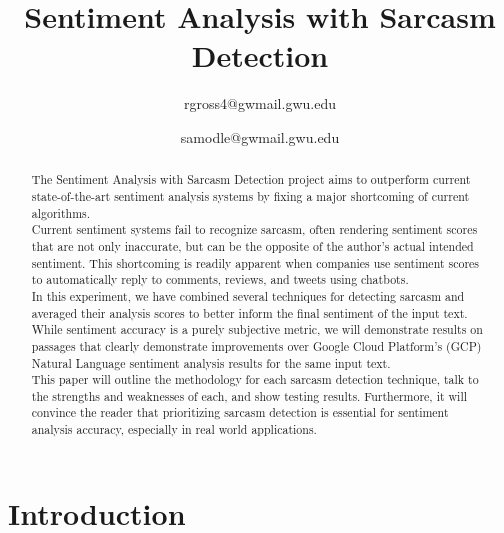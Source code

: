 \documentclass[conference]{IEEEtran}
\begin{document}
\title{Sentiment Analysis with Sarcasm Detection\\
}

\author{
rgross4@gwmail.gwu.edu
\and
{}
samodle@gwmail.gwu.edu
}

\maketitle

\begin{abstract}
The Sentiment Analysis with Sarcasm Detection project aims to outperform current state-of-the-art sentiment analysis systems by fixing a major shortcoming of current algorithms. \\
Current sentiment systems fail to recognize sarcasm, often rendering sentiment scores that are not only inaccurate, but can be the opposite of the author’s actual intended sentiment. This shortcoming is readily apparent when companies use sentiment scores to automatically reply to comments, reviews, and tweets using chatbots. \\
In this experiment, we have combined several techniques for detecting sarcasm and averaged their analysis scores to better inform the final sentiment of the input text. While sentiment accuracy is a purely subjective metric, we will demonstrate results on passages that clearly demonstrate improvements over Google Cloud Platform’s (GCP) Natural Language sentiment analysis results for the same input text. \\
This paper will outline the methodology for each sarcasm detection technique, talk to the strengths and weaknesses of each, and show testing results. Furthermore, it will convince the reader that prioritizing sarcasm detection is essential for sentiment analysis accuracy, especially in real world applications. 

\end{abstract}

\section{Introduction}
\end{document}
